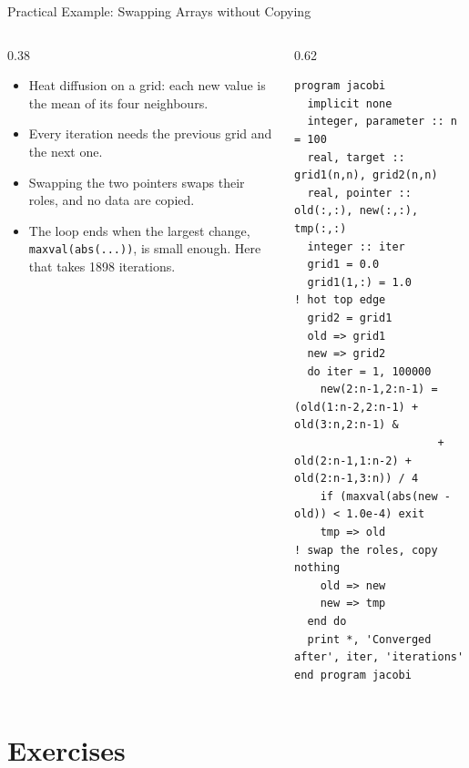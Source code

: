\begin{frame}[fragile]{Practical Example: Swapping Arrays without Copying}
  \begin{columns}[T]
    \begin{column}{0.38\textwidth}
      \begin{itemize}
        \item Heat diffusion on a grid: each new value is the mean of its four neighbours.
        \item Every iteration needs the previous grid and the next one.
        \item Swapping the two pointers swaps their roles, and no data are copied.
        \item The loop ends when the largest change, \texttt{maxval(abs(...))}, is small enough. Here that takes 1898 iterations.
      \end{itemize}
    \end{column}

    \begin{column}{0.62\textwidth}
      \begin{lstlisting}[aboveskip=0pt, belowskip=0pt]
program jacobi
  implicit none
  integer, parameter :: n = 100
  real, target :: grid1(n,n), grid2(n,n)
  real, pointer :: old(:,:), new(:,:), tmp(:,:)
  integer :: iter
  grid1 = 0.0
  grid1(1,:) = 1.0        ! hot top edge
  grid2 = grid1
  old => grid1
  new => grid2
  do iter = 1, 100000
    new(2:n-1,2:n-1) = (old(1:n-2,2:n-1) + old(3:n,2:n-1) &
                      + old(2:n-1,1:n-2) + old(2:n-1,3:n)) / 4
    if (maxval(abs(new - old)) < 1.0e-4) exit
    tmp => old            ! swap the roles, copy nothing
    old => new
    new => tmp
  end do
  print *, 'Converged after', iter, 'iterations'
end program jacobi
      \end{lstlisting}
    \end{column}
  \end{columns}
\end{frame}


\section{Exercises}

